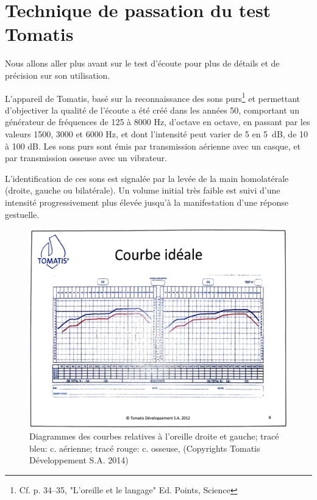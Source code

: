 \section{Technique de passation du test Tomatis}
Nous allons aller plus avant sur le test d'écoute pour plus de détails et de précision sur son utilisation.

L'appareil de Tomatis, basé sur la reconnaissance des sons purs\footnote{Cf. p. 34--35, "L'oreille et le langage" Ed. Points, Science} et
permettant d'objectiver la qualité de l'écoute
 a été créé dans les années 50, comportant un générateur de fréquences
  de 125 à 8000 Hz, d'octave en octave, en passant par les valeurs
1500, 3000 et 6000 Hz, et dont l'intensité peut varier de 5 en \SI{5}{\dB}, de 10 à 100 dB.
Les sons purs sont émis par 
  transmission aérienne avec un casque, et par transmission osseuse
  avec un vibrateur.

  L'identification de ces sons est
  signalée par la levée de la main homolatérale (droite, gauche ou
  bilatérale).
Un volume initial très faible est suivi d'une intensité
progressivement plus élevée jusqu'à la manifestation d'une réponse gestuelle.



\begin{figure}
	\centering
	\includegraphics[width=1\linewidth]{images/graphiques/courbeideale.png}
	\caption[Courbe idéale]{Diagrammes des courbes relatives à l'oreille droite et
          gauche; tracé bleu: c. aérienne; tracé rouge: c.
          osseuse, (Copyrights Tomatis Développement S.A.  2014) }
	\label{Courbe idéale}
\end{figure}




